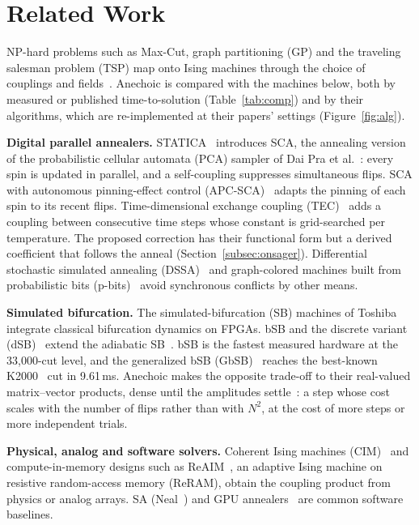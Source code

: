 \section{Related Work}\label{sec:related}
NP-hard problems such as Max-Cut, graph partitioning (GP) and the traveling salesman problem (TSP) map onto Ising machines through the choice of couplings and fields~\cite{lucas2014ising}. Anechoic is compared with the machines below, both by measured or published time-to-solution (Table~\ref{tab:comp}) and by their algorithms, which are re-implemented at their papers' settings (Figure~\ref{fig:alg}).

\noindent\textbf{Digital parallel annealers.} STATICA~\cite{9062965,yamamoto2021statica} introduces SCA, the annealing version of the probabilistic cellular automata (PCA) sampler of Dai Pra et al.~\cite{daipra2012sampling}: every spin is updated in parallel, and a self-coupling suppresses simultaneous flips. SCA with autonomous pinning-effect control (APC-SCA)~\cite{okonogi2023apc} adapts the pinning of each spin to its recent flips. Time-dimensional exchange coupling (TEC)~\cite{du2026tec} adds a coupling between consecutive time steps whose constant is grid-searched per temperature. The proposed correction has their functional form but a derived coefficient that follows the anneal (Section~\ref{subsec:onsager}). Differential stochastic simulated annealing (DSSA)~\cite{onizawa2026dssa} and graph-colored machines built from probabilistic bits (p-bits)~\cite{10185207} avoid synchronous conflicts by other means.

\noindent\textbf{Simulated bifurcation.} The simulated-bifurcation (SB) machines of Toshiba integrate classical bifurcation dynamics on FPGAs. bSB and the discrete variant (dSB)~\cite{goto2021high} extend the adiabatic SB~\cite{goto2019combinatorial}. bSB is the fastest measured hardware at the 33{,}000-cut level, and the generalized bSB (GbSB)~\cite{goto2026edge} reaches the best-known K2000~\cite{doi:10.1126/science.aah4243} cut in 9.61\,ms. Anechoic makes the opposite trade-off to their real-valued matrix--vector products, dense until the amplitudes settle~\cite{goto2021high}: a step whose cost scales with the number of flips rather than with $N^2$, at the cost of more steps or more independent trials.

\noindent\textbf{Physical, analog and software solvers.} Coherent Ising machines (CIM)~\cite{doi:10.1126/science.aah4243} and compute-in-memory designs such as ReAIM~\cite{10609617}, an adaptive Ising machine on resistive random-access memory (ReRAM), obtain the coupling product from physics or analog arrays. SA (Neal~\cite{dwave_neal}) and GPU annealers~\cite{9643932} are common software baselines.

